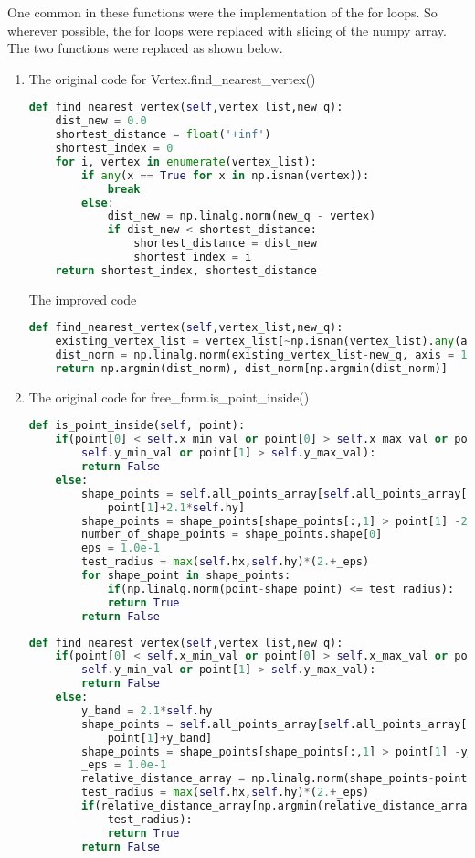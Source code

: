 One common in these functions were the implementation of the for loops. So wherever possible, the for loops were replaced with slicing of the numpy array. The two functions were replaced as shown below.
\begin{enumerate}
\item The original code for Vertex.find\_nearest\_vertex()
\begin{lstlisting}[language=python]
def find_nearest_vertex(self,vertex_list,new_q):
	dist_new = 0.0
	shortest_distance = float('+inf') 
	shortest_index = 0	
	for i, vertex in enumerate(vertex_list):
		if any(x == True for x in np.isnan(vertex)):
			break 
		else:
			dist_new = np.linalg.norm(new_q - vertex)
			if dist_new < shortest_distance:					
				shortest_distance = dist_new
				shortest_index = i		
	return shortest_index, shortest_distance
\end{lstlisting}
The improved code
\begin{lstlisting}[language=python]
def find_nearest_vertex(self,vertex_list,new_q):
	existing_vertex_list = vertex_list[~np.isnan(vertex_list).any(axis=1)]
	dist_norm = np.linalg.norm(existing_vertex_list-new_q, axis = 1)
	return np.argmin(dist_norm), dist_norm[np.argmin(dist_norm)]
\end{lstlisting}

\item The original code for free\_form.is\_point\_inside()
\begin{lstlisting}[language=python]
def is_point_inside(self, point):
	if(point[0] < self.x_min_val or point[0] > self.x_max_val or point[1] < 
		self.y_min_val or point[1] > self.y_max_val):
		return False
	else:
		shape_points = self.all_points_array[self.all_points_array[:,1] < 
			point[1]+2.1*self.hy]
		shape_points = shape_points[shape_points[:,1] > point[1] -2.1*self.hy]
		number_of_shape_points = shape_points.shape[0]
		eps = 1.0e-1
		test_radius = max(self.hx,self.hy)*(2.+_eps)
		for shape_point in shape_points:
			if(np.linalg.norm(point-shape_point) <= test_radius):
			return True
		return False
\end{lstlisting}

\begin{lstlisting}[language=python]
def find_nearest_vertex(self,vertex_list,new_q):
	if(point[0] < self.x_min_val or point[0] > self.x_max_val or point[1] < 
		self.y_min_val or point[1] > self.y_max_val):
		return False
	else:
		y_band = 2.1*self.hy
		shape_points = self.all_points_array[self.all_points_array[:,1] < 
			point[1]+y_band]
		shape_points = shape_points[shape_points[:,1] > point[1] -y_band]
		_eps = 1.0e-1
		relative_distance_array = np.linalg.norm(shape_points-point, axis = 1)
		test_radius = max(self.hx,self.hy)*(2.+_eps)
		if(relative_distance_array[np.argmin(relative_distance_array)] < 
			test_radius):
			return True
		return False
\end{lstlisting}
\end{enumerate}

